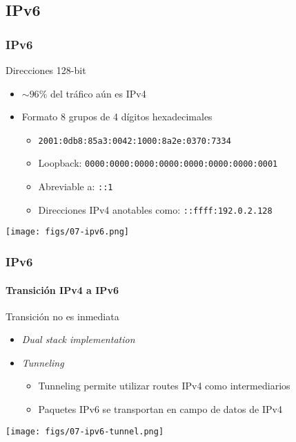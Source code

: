 \documentclass[letter]{beamer}
\begin{document}
\subsection{IPv6}

\begin{frame}
  \frametitle{IPv6}
  
  Direcciones 128-bit
  \begin{itemize}
    \item $\sim 96\%$ del tráfico aún es IPv4
    \item Formato 8 grupos de 4 dígitos hexadecimales
      \begin{itemize}
        \item {\tt 2001:0db8:85a3:0042:1000:8a2e:0370:7334}
        \item Loopback: {\tt 0000:0000:0000:0000:0000:0000:0000:0001}
        \item Abreviable a: {\tt ::1}
        \item Direcciones IPv4 anotables como: {\tt ::ffff:192.0.2.128}
      \end{itemize}
  \end{itemize}
  
  \begin{center}
    \texttt{[image: figs/07-ipv6.png]}
  \end{center}

\end{frame}

\begin{frame}
  \frametitle{IPv6}
  \framesubtitle{Transición IPv4 a IPv6}

  Transición no es inmediata
  \begin{itemize}
    \item {\em Dual stack implementation}
    \item {\em Tunneling}
       \begin{itemize}
         \item Tunneling permite utilizar routes IPv4 como intermediarios
    	 \item Paquetes IPv6 se transportan en campo de datos de IPv4
       \end{itemize}
  \end{itemize}
  \begin{center}
    \texttt{[image: figs/07-ipv6-tunnel.png]}
  \end{center}

\end{frame}
\end{document}
